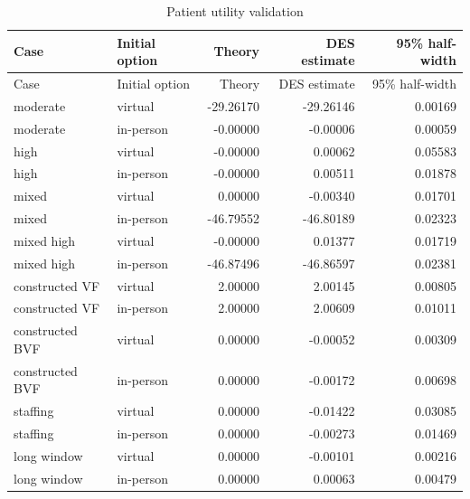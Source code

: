 \begin{longtable}{llrrr}
\caption{Patient utility validation}\label{tab:utilities}\\
\toprule Case & Initial option & Theory & DES estimate & 95\% half-width\\\midrule\endfirsthead
\toprule Case & Initial option & Theory & DES estimate & 95\% half-width\\\midrule\endhead
moderate & virtual & -29.26170 & -29.26146 & 0.00169\\
moderate & in-person & -0.00000 & -0.00006 & 0.00059\\
high & virtual & -0.00000 & 0.00062 & 0.05583\\
high & in-person & -0.00000 & 0.00511 & 0.01878\\
mixed & virtual & 0.00000 & -0.00340 & 0.01701\\
mixed & in-person & -46.79552 & -46.80189 & 0.02323\\
mixed high & virtual & -0.00000 & 0.01377 & 0.01719\\
mixed high & in-person & -46.87496 & -46.86597 & 0.02381\\
constructed VF & virtual & 2.00000 & 2.00145 & 0.00805\\
constructed VF & in-person & 2.00000 & 2.00609 & 0.01011\\
constructed BVF & virtual & 0.00000 & -0.00052 & 0.00309\\
constructed BVF & in-person & 0.00000 & -0.00172 & 0.00698\\
staffing & virtual & 0.00000 & -0.01422 & 0.03085\\
staffing & in-person & 0.00000 & -0.00273 & 0.01469\\
long window & virtual & 0.00000 & -0.00101 & 0.00216\\
long window & in-person & 0.00000 & 0.00063 & 0.00479\\
\bottomrule\end{longtable}
